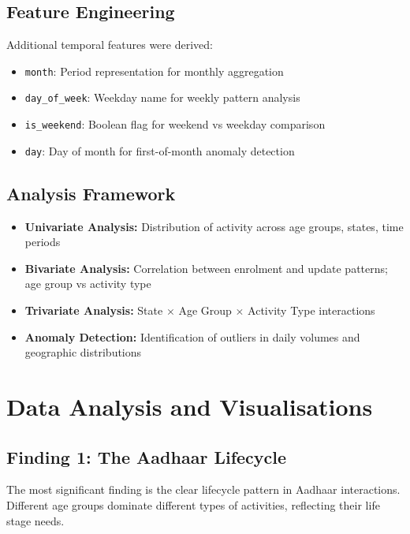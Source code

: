 \documentclass[11pt,a4paper]{article}
\begin{document}
\subsection{Feature Engineering}

Additional temporal features were derived:
\begin{itemize}
    \item \texttt{month}: Period representation for monthly aggregation
    \item \texttt{day\_of\_week}: Weekday name for weekly pattern analysis
    \item \texttt{is\_weekend}: Boolean flag for weekend vs weekday comparison
    \item \texttt{day}: Day of month for first-of-month anomaly detection
\end{itemize}

\subsection{Analysis Framework}

\begin{itemize}
    \item \textbf{Univariate Analysis:} Distribution of activity across age groups, states, time periods
    \item \textbf{Bivariate Analysis:} Correlation between enrolment and update patterns; age group vs activity type
    \item \textbf{Trivariate Analysis:} State $\times$ Age Group $\times$ Activity Type interactions
    \item \textbf{Anomaly Detection:} Identification of outliers in daily volumes and geographic distributions
\end{itemize}

\section{Data Analysis and Visualisations}

\subsection{Finding 1: The Aadhaar Lifecycle}

The most significant finding is the clear lifecycle pattern in Aadhaar interactions. Different age groups dominate different types of activities, reflecting their life stage needs.
\end{document}
